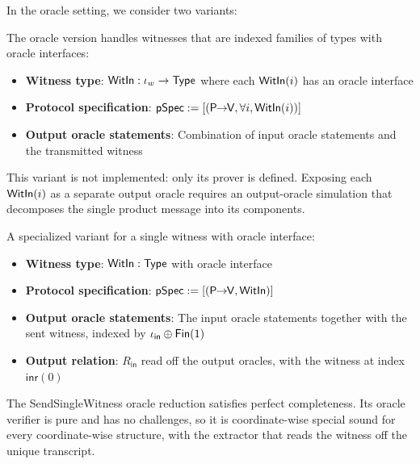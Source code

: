 In the oracle setting, we consider two variants:

\begin{definition}
    \label{def:sendwitness_oracle_reduction}
    The oracle version handles witnesses that are indexed families of types with oracle interfaces:
    \begin{itemize}
        \item \textbf{Witness type}: $\mathsf{WitIn} : \iota_w \to \mathsf{Type}$ where each $\mathsf{WitIn}(i)$ has an oracle interface
        \item \textbf{Protocol specification}: $\mathsf{pSpec} := [(\mathsf{P \!\!\rightarrow\!\! V}, \forall i, \mathsf{WitIn}(i))]$
        \item \textbf{Output oracle statements}: Combination of input oracle statements and the transmitted witness
    \end{itemize}
    This variant is not implemented: only its prover is defined. Exposing each $\mathsf{WitIn}(i)$ as a separate output oracle requires an output-oracle simulation that decomposes the single product message into its components.
\end{definition}

\begin{definition}
    \label{def:sendsinglewitness_oracle_reduction}
    A specialized variant for a single witness with oracle interface:
    \begin{itemize}
        \item \textbf{Witness type}: $\mathsf{WitIn} : \mathsf{Type}$ with oracle interface
        \item \textbf{Protocol specification}: $\mathsf{pSpec} := [(\mathsf{P \!\!\rightarrow\!\! V}, \mathsf{WitIn})]$
        \item \textbf{Output oracle statements}: The input oracle statements together with the sent witness, indexed by $\iota_{\mathsf{in}} \oplus \mathsf{Fin}(1)$
        \item \textbf{Output relation}: $R_{\mathsf{in}}$ read off the output oracles, with the witness at index $\mathsf{inr}(0)$
    \end{itemize}
    \leanok
\end{definition}

\begin{theorem}
    The SendSingleWitness oracle reduction satisfies perfect completeness. Its oracle verifier is pure and has no challenges, so it is coordinate-wise special sound for every coordinate-wise structure, with the extractor that reads the witness off the unique transcript.
    \leanok
\end{theorem}


